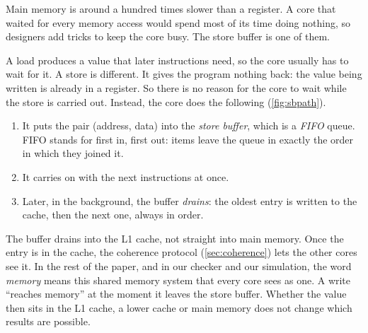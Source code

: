 Main memory is around a hundred times slower than a register. A core that waited for every memory access would spend most of its time doing nothing, so designers add tricks to keep the core busy. The store buffer is one of them.

A load produces a value that later instructions need, so the core usually has to wait for it. A store is different. It gives the program nothing back: the value being written is already in a register. So there is no reason for the core to wait while the store is carried out. Instead, the core does the following (\cref{fig:sbpath}).
\begin{enumerate}
\item It puts the pair (address, data) into the \emph{store buffer}, which is a \emph{FIFO} queue. FIFO stands for first in, first out: items leave the queue in exactly the order in which they joined it.
\item It carries on with the next instructions at once.
\item Later, in the background, the buffer \emph{drains}: the oldest entry is written to the cache, then the next one, always in order.
\end{enumerate}

The buffer drains into the L1 cache, not straight into main memory. Once the entry is in the cache, the coherence protocol (\cref{sec:coherence}) lets the other cores see it. In the rest of the paper, and in our checker and our simulation, the word \emph{memory} means this shared memory system that every core sees as one. A write ``reaches memory'' at the moment it leaves the store buffer. Whether the value then sits in the L1 cache, a lower cache or main memory does not change which results are possible.

